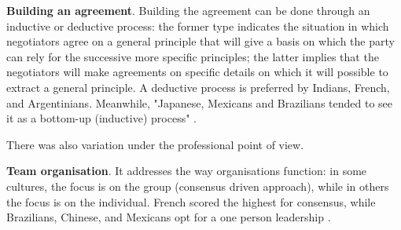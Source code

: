 \documentclass[../main.tex]{subfiles}
\begin{document}
\textbf{Building an agreement}. Building the agreement can be done through an inductive or deductive process: the former type indicates the situation in which negotiators agree on a general principle that will give a basis on which the party can rely for the successive more specific principles; the latter implies that the negotiators will make agreements on specific details on which it will possible to extract a general principle. A deductive process is preferred by Indians, French, and Argentinians. Meanwhile, "Japanese, Mexicans and Brazilians tended to see it as a bottom-up (inductive) process" \autocite[234]{salacuse}.

\vspace{0.3cm}
\begin{minipage}{\linewidth}
    \label{buildingAgreementPerCountry}
\end{minipage}
\vspace{0.3cm}

There was also variation under the professional point of view.

\vspace{0.3cm}
\begin{minipage}{\linewidth}
    \label{buildingAgreementPerProfession}
\end{minipage}
\vspace{0.3cm}

\textbf{Team organisation}. It addresses the way organisations function: in some cultures, the focus is on the group (consensus driven approach), while in others the focus is on the individual. French scored the highest for consensus, while Brazilians, Chinese, and Mexicans opt for a one person leadership \autocite[135]{salacuse}.

\vspace{0.3cm}
\begin{minipage}{\linewidth}
    \label{teamOrganisationPerCountry}
\end{minipage}
\vspace{0.3cm}
\end{document}
